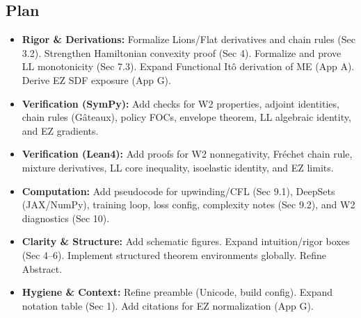 ﻿\documentclass[11pt,letterpaper,oneside]{article}
\numberwithin{equation}{section}
\newcommand{\1}{\mathbf{1}}
\begin{document}
\subsection*{Plan}
\begin{itemize}[leftmargin=1.2em]
  \item \textbf{Rigor \& Derivations:} Formalize Lions/Flat derivatives and chain rules (Sec 3.2). Strengthen Hamiltonian convexity proof (Sec 4). Formalize and prove LL monotonicity (Sec 7.3). Expand Functional Itô derivation of ME (App A). Derive EZ SDF exposure (App G).
  \item \textbf{Verification (SymPy):} Add checks for W2 properties, adjoint identities, chain rules (Gâteaux), policy FOCs, envelope theorem, LL algebraic identity, and EZ gradients.
  \item \textbf{Verification (Lean4):} Add proofs for W2 nonnegativity, Fréchet chain rule, mixture derivatives, LL core inequality, isoelastic identity, and EZ limits.
  \item \textbf{Computation:} Add pseudocode for upwinding/CFL (Sec 9.1), DeepSets (JAX/NumPy), training loop, loss config, complexity notes (Sec 9.2), and W2 diagnostics (Sec 10).
  \item \textbf{Clarity \& Structure:} Add schematic figures. Expand intuition/rigor boxes (Sec 4–6). Implement structured theorem environments globally. Refine Abstract.
  \item \textbf{Hygiene \& Context:} Refine preamble (Unicode, build config). Expand notation table (Sec 1). Add citations for EZ normalization (App G).
\end{itemize}
\end{document}
